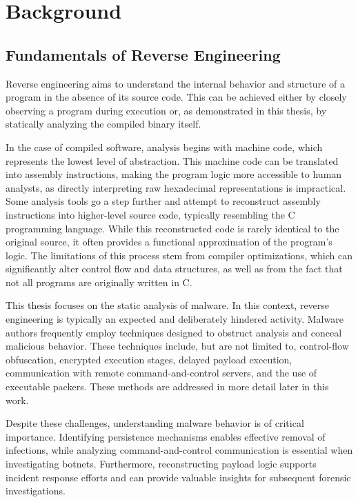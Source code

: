 \cleardoubleoddpage%
\chapter{Background}
\label{sec:background}


\section{Fundamentals of Reverse Engineering}
\label{sec:background:fundamentals}

Reverse engineering aims to understand the internal behavior and structure of a program in the absence of its source code. 
This can be achieved either by closely observing a program during execution or, as demonstrated in this thesis, by statically analyzing the compiled binary itself.

In the case of compiled software, analysis begins with machine code, which represents the lowest level of abstraction. 
This machine code can be translated into assembly instructions, making the program logic more accessible to human analysts, as directly interpreting 
raw hexadecimal representations is impractical. Some analysis tools go a step further and attempt to reconstruct assembly instructions into higher-level source code, 
typically resembling the C programming language. While this reconstructed code is rarely identical to the original source, it often provides a functional approximation 
of the program's logic. The limitations of this process stem from compiler optimizations, which can significantly alter control flow and data structures, as well as 
from the fact that not all programs are originally written in C.

This thesis focuses on the static analysis of malware. In this context, reverse engineering is typically an expected and deliberately hindered activity. 
Malware authors frequently employ techniques designed to obstruct analysis and conceal malicious behavior. These techniques include, but are not limited to, 
control-flow obfuscation, encrypted execution stages, delayed payload execution, communication with remote command-and-control servers, and the use of executable packers. 
These methods are addressed in more detail later in this work.

Despite these challenges, understanding malware behavior is of critical importance. Identifying persistence mechanisms enables effective removal of infections, 
while analyzing command-and-control communication is essential when investigating botnets. Furthermore, reconstructing payload logic supports incident response efforts 
and can provide valuable insights for subsequent forensic investigations.

